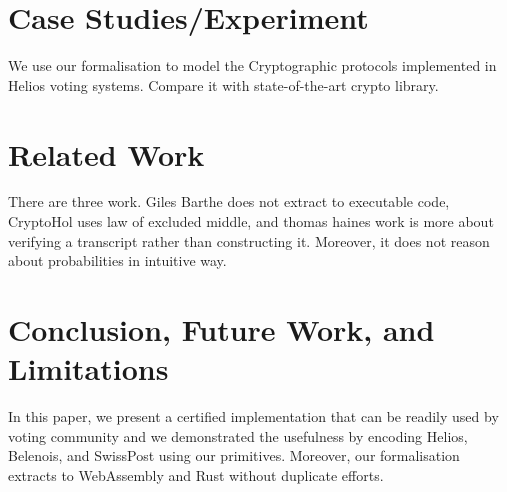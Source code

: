 \documentclass[sigconf]{acmart}
\begin{document}
\section{Case Studies/Experiment}
  We use our formalisation to model the Cryptographic protocols implemented in 
  Helios voting systems. Compare it with state-of-the-art 
  crypto library. 


\section{Related Work}
  There are three work. Giles Barthe does not extract to executable code, 
  CryptoHol uses law of excluded middle, and thomas haines work is more about 
  verifying a transcript rather than constructing it. Moreover, 
  it does not reason about probabilities in intuitive way. 

\section{Conclusion, Future Work, and Limitations}
  In this paper, we present a certified implementation 
  that can be readily used by voting community and 
  we demonstrated the usefulness by encoding Helios, 
  Belenois, and SwissPost using our primitives. 
  Moreover, our formalisation extracts to WebAssembly and 
  Rust without duplicate efforts. 








\end{document}
